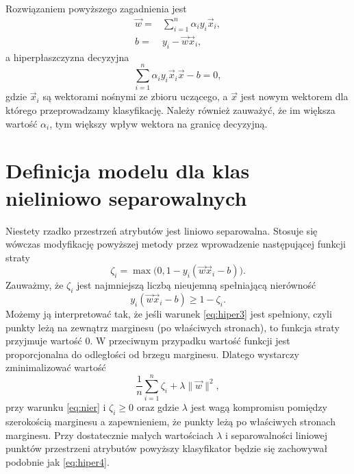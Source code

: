 \documentclass[
]{book}
\theoremstyle{plain}
\theoremstyle{definition}
\theoremstyle{definition}
\theoremstyle{definition}
\theoremstyle{definition}
\theoremstyle{definition}
\theoremstyle{remark}
\begin{document}
Rozwiązaniem powyższego zagadnienia jest
\begin{align}
    \vec{w}=&\sum_{i=1}^{n}\alpha_iy_i\vec{x}_i,\label{eq:lagrange3}\\
        b=&y_i-\vec{w}\vec{x}_i,
        \label{eq:lagrange4}
\end{align}
a hiperpłaszczyzna decyzyjna
\begin{equation}
\sum_{i=1}^{n}\alpha_iy_i\vec{x}_i\vec{x}-b=0,
\label{eq:hiper5}
\end{equation}
gdzie \(\vec{x}_i\) są wektorami nośnymi ze zbioru uczącego, a \(\vec{x}\) jest nowym wektorem dla którego przeprowadzamy klasyfikację.
Należy również zauważyć, że im większa wartość \(\alpha_i\), tym większy wpływ wektora na granicę decyzyjną.

\section{Definicja modelu dla klas nieliniowo separowalnych}\label{definicja-modelu-dla-klas-nieliniowo-separowalnych}

Niestety rzadko przestrzeń atrybutów jest liniowo separowalna. Stosuje się wówczas modyfikację powyższej metody przez wprowadzenie następującej funkcji straty
\begin{equation}
    \zeta_i=\max\big(0,1-y_i(\vec{w}\vec{x}_i-b)\big).
    \label{eq:strata1}
\end{equation}
Zauważmy, że \(\zeta_i\) jest najmniejszą liczbą nieujemną spełniającą nierówność
\begin{equation}
    y_i(\vec{w}\vec{x}_i-b)\geq 1-\zeta_i.
    \label{eq:nier}
\end{equation}
Możemy ją interpretować tak, że jeśli warunek \eqref{eq:hiper3} jest spełniony, czyli punkty leżą na zewnątrz marginesu (po właściwych stronach), to funkcja straty przyjmuje wartość 0. W przeciwnym przypadku wartość funkcji jest proporcjonalna do odległości od brzegu marginesu. Dlatego wystarczy zminimalizować wartość
\begin{equation}
    \frac{1}{n}\sum_{i=1}^{n}\zeta_i+\lambda\|\vec{w}\|^2,
    \label{eq:strata2}
\end{equation}
przy warunku \eqref{eq:nier} i \(\zeta_i\geq 0\) oraz gdzie \(\lambda\) jest wagą kompromisu pomiędzy szerokością marginesu a zapewnieniem, że punkty leżą po właściwych stronach marginesu. Przy dostatecznie małych wartościach \(\lambda\) i separowalności liniowej punktów przestrzeni atrybutów powyższy klasyfikator będzie się zachowywał podobnie jak \eqref{eq:hiper4}.
\end{document}
